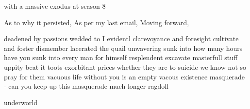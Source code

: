with a massive exodus at season 8

%
As to why it persisted, As per my last email, Moving forward,


deadened by passions wedded to
I evidentl
clarevoyance and foresight
cultivate and foster
dismember lacerated the quail
unwavering
sunk into how many hours have you sunk into
every man for himself resplendent
excavate
masterfull stuff
uppity
beat it toots
exorbitant prices
whether they are to suicide we know not so pray for them
vacuous life without you is an empty vacous existence
masquerade - can you keep up this masquerade much longer
ragdoll

underworld


